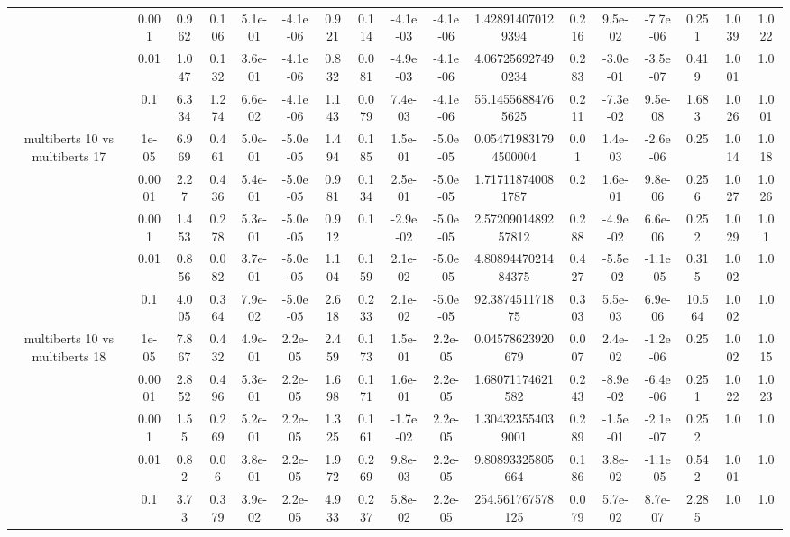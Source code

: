 \begin{tabular}{|c|c|c|c|c|c|c|c|c|c|c|c|c|c|c|c|c|}
 & 0.001 & 0.962 & 0.106 & 5.1e-01 & -4.1e-06 & 0.921 & 0.114 & -4.1e-03 & -4.1e-06 & 1.428914070129394 & 0.216 & 9.5e-02 & -7.7e-06 & 0.251 & 1.039 & 1.022 \\
 & 0.01 & 1.047 & 0.132 & 3.6e-01 & -4.1e-06 & 0.832 & 0.081 & -4.9e-03 & -4.1e-06 & 4.067256927490234 & 0.283 & -3.0e-01 & -3.5e-07 & 0.419 & 1.001 & 1.0 \\
 & 0.1 & 6.334 & 1.274 & 6.6e-02 & -4.1e-06 & 1.143 & 0.079 & 7.4e-03 & -4.1e-06 & 55.14556884765625 & 0.211 & -7.3e-02 & 9.5e-08 & 1.683 & 1.026 & 1.001 \\
\hline
\multirow{5}{*}{multiberts 10 vs multiberts 17} & 1e-05 & 6.969 & 0.461 & 5.0e-01 & -5.0e-05 & 1.494 & 0.185 & 1.5e-01 & -5.0e-05 & 0.054719831794500004 & 0.01 & 1.4e-03 & -2.6e-06 & 0.25 & 1.014 & 1.018 \\
 & 0.0001 & 2.27 & 0.436 & 5.4e-01 & -5.0e-05 & 0.981 & 0.134 & 2.5e-01 & -5.0e-05 & 1.717118740081787 & 0.2 & 1.6e-01 & 9.8e-06 & 0.256 & 1.027 & 1.026 \\
 & 0.001 & 1.453 & 0.278 & 5.3e-01 & -5.0e-05 & 0.912 & 0.1 & -2.9e-02 & -5.0e-05 & 2.5720901489257812 & 0.288 & -4.9e-02 & 6.6e-06 & 0.252 & 1.029 & 1.01 \\
 & 0.01 & 0.856 & 0.082 & 3.7e-01 & -5.0e-05 & 1.104 & 0.159 & 2.1e-02 & -5.0e-05 & 4.8089447021484375 & 0.427 & -5.5e-02 & -1.1e-05 & 0.315 & 1.002 & 1.0 \\
 & 0.1 & 4.005 & 0.364 & 7.9e-02 & -5.0e-05 & 2.618 & 0.233 & 2.1e-02 & -5.0e-05 & 92.387451171875 & 0.303 & 5.5e-03 & 6.9e-06 & 10.564 & 1.002 & 1.0 \\
\hline
\multirow{5}{*}{multiberts 10 vs multiberts 18} & 1e-05 & 7.867 & 0.432 & 4.9e-01 & 2.2e-05 & 2.459 & 0.173 & 1.5e-01 & 2.2e-05 & 0.04578623920679 & 0.007 & 2.4e-02 & -1.2e-06 & 0.25 & 1.002 & 1.015 \\
 & 0.0001 & 2.852 & 0.496 & 5.3e-01 & 2.2e-05 & 1.698 & 0.171 & 1.6e-01 & 2.2e-05 & 1.68071174621582 & 0.243 & -8.9e-02 & -6.4e-06 & 0.251 & 1.022 & 1.023 \\
 & 0.001 & 1.55 & 0.269 & 5.2e-01 & 2.2e-05 & 1.325 & 0.161 & -1.7e-02 & 2.2e-05 & 1.304323554039001 & 0.289 & -1.5e-01 & -2.1e-07 & 0.252 & 1.0 & 1.0 \\
 & 0.01 & 0.82 & 0.06 & 3.8e-01 & 2.2e-05 & 1.972 & 0.269 & 9.8e-03 & 2.2e-05 & 9.80893325805664 & 0.186 & 3.8e-02 & -1.1e-05 & 0.542 & 1.001 & 1.0 \\
 & 0.1 & 3.73 & 0.379 & 3.9e-02 & 2.2e-05 & 4.933 & 0.237 & 5.8e-02 & 2.2e-05 & 254.561767578125 & 0.079 & 5.7e-02 & 8.7e-07 & 2.285 & 1.0 & 1.0 \\

\end{tabular}
